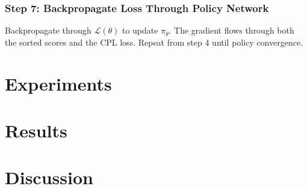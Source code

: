 \documentclass[11pt]{article}
\begin{document}
\subsubsection*{Step 7: Backpropagate Loss Through Policy Network}
Backpropagate through $\mathcal{L}(\theta)$ to update $\pi_\theta$. The gradient flows through both the sorted scores and the CPL loss. Repeat from step 4 until policy convergence.
\newpage


\section{Experiments}



\section{Results}


\section{Discussion}
\end{document}
